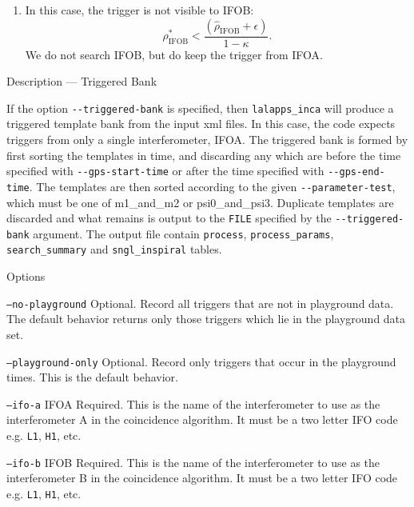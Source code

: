 \begin{entry}
\begin{enumerate}
\item In this case, the trigger is not visible to \textsc{IFOB}:
%
\begin{equation}
  \rho_\mathrm{IFOB}^{*} <
  \frac{(\hat{\rho}_\mathrm{IFOB} + \epsilon)} {1 - \kappa} .
\end{equation}
%
We do not search \textsc{IFOB}, but do keep the trigger from \textsc{IFOA}.

\end{enumerate}

\item[Description --- Triggered Bank] 
  
If the option \verb$--triggered-bank$ is specified, then \texttt{lalapps\_inca}
will produce a triggered template bank from the input xml files.  In this case,
the code expects triggers from only a single interferometer, {IFOA}.  The
triggered bank is formed by first sorting the templates in time, and discarding
any which are before the time specified with \verb$--gps-start-time$ or after
the time specified with \verb$--gps-end-time$.  The templates are then sorted
according to the given \verb$--parameter-test$, which must be one of m1\_and\_m2
or psi0\_and\_psi3.  Duplicate templates are discarded and what remains is
output to the \texttt{FILE} specified by the \verb$--triggered-bank$ argument.
The output file contain \texttt{process}, \texttt{process\_params},
\texttt{search\_summary} and \texttt{sngl\_inspiral} tables.  

\item[Options]\leavevmode
\begin{entry}
\item[\texttt{--no-playground}] Optional.  Record all triggers that are
not in playground data.  The default behavior returns only those triggers
which lie in the playground data set.  

\item[\texttt{--playground-only}] Optional.  Record only triggers that
occur in the playground times.  This is the default behavior.

\item[\texttt{--ifo-a} \textsc{IFOA}] Required. This is the name of the
interferometer to use as the interferometer A in the coincidence algorithm.
It must be a two letter IFO code e.g. \texttt{L1}, \texttt{H1}, etc.

\item[\texttt{--ifo-b} \textsc{IFOB}] Required. This is the name of the
interferometer to use as the interferometer B in the coincidence algorithm.
It must be a two letter IFO code e.g. \texttt{L1}, \texttt{H1}, etc.


\end{entry}
\end{entry}
